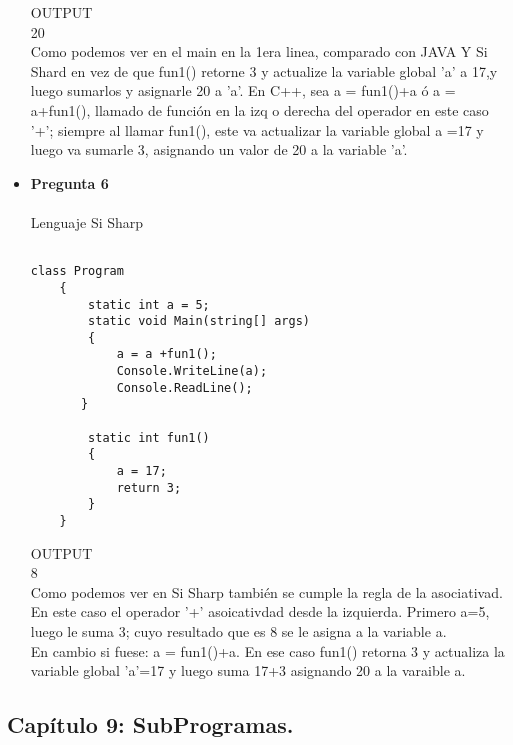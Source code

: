 \documentclass[12pt,oneside]{article}
\begin{document}
\begin{itemize}
OUTPUT\\
20\\
Como podemos ver en el main en la 1era linea, comparado con JAVA Y Si Shard en vez de que fun1() retorne 3 y actualize la variable global 'a' a 17,y luego sumarlos y asignarle 20 a 'a'. En C++, sea a = fun1()+a  ó  a = a+fun1(), llamado de función en la izq o derecha del operador en este caso '+'; siempre al llamar fun1(), este va actualizar la variable global a =17 y luego va sumarle 3, asignando un valor de 20 a  la variable 'a'. 


\item {\bf Pregunta 6} \\\\
Lenguaje Si Sharp\\
\begin{lstlisting}[frame=single]  % Start your code-block

class Program
    {
        static int a = 5;
        static void Main(string[] args)
        {
            a = a +fun1();
            Console.WriteLine(a);
            Console.ReadLine();
       }

        static int fun1()
        {
            a = 17;
            return 3;
        }
    }
\end{lstlisting}
OUTPUT\\
8\\ 
Como podemos ver en Si Sharp también se cumple la regla de la asociativad. En este caso el operador '+' asoicativdad desde la izquierda. Primero a=5, luego le suma 3; cuyo resultado que es 8 se le asigna a la variable a.\\
En cambio si fuese:  a = fun1()+a. En ese caso fun1() retorna 3 y actualiza la variable global 'a'=17 y luego suma 17+3 asignando 20 a la varaible a.




\end{itemize}


\subsection{Capítulo 9: SubProgramas.}

%

        




\end{document}
